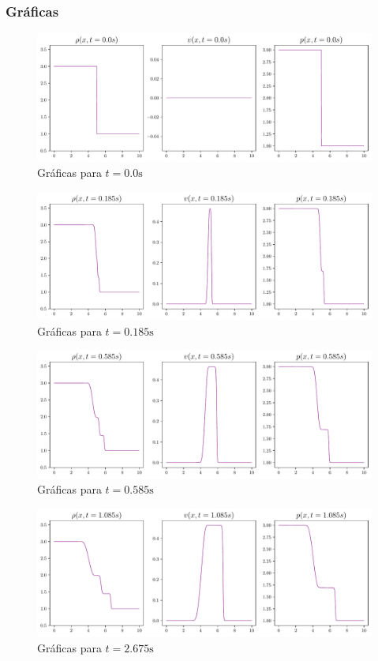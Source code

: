 \subsubsection{Gráficas}
\begin{figure}[ht]
	\centering
	\includegraphics[width=1.1\linewidth]{../euler1D/plots_en_TDG/set2/1.pdf}
	\caption{Gráficas para $t=0.0\unit{\s}$}
\end{figure}
\begin{figure}[ht]
	\includegraphics[width=1.1\linewidth]{../euler1D/plots_en_TDG/set2/20.pdf}
	\caption{Gráficas para $t=0.185\unit{\s}$}
\end{figure}
\begin{figure}[ht]
	\includegraphics[width=1.1\linewidth]{../euler1D/plots_en_TDG/set2/60.pdf}
	\caption{Gráficas para $t=0.585\unit{\s}$}
\end{figure}
\begin{figure}[ht]
	\includegraphics[width=1.1\linewidth]{../euler1D/plots_en_TDG/set2/110.pdf}
	\caption{Gráficas para $t=2.675\unit{\s}$}
\end{figure}
\clearpage
